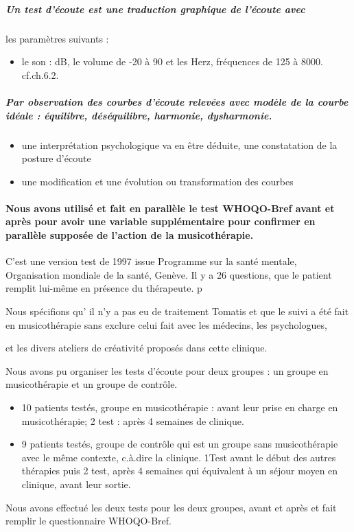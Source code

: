 \documentclass[12pt,french]{report}
\begin{document}
\subparagraph{Un test d'écoute est une traduction graphique de l'écoute avec }

les paramètres suivants : 
\begin{itemize}
\item le son : dB, le volume de -20 à 90 et les Herz, fréquences de 125
à 8000. cf.ch.6.2.
\end{itemize}

\subparagraph{Par observation des courbes d'écoute relevées avec modèle de la courbe
idéale : équilibre, déséquilibre, harmonie, dysharmonie.}
\begin{itemize}
\item une interprétation psychologique va en être déduite, une constatation
de la posture d'écoute
\item une modification et une évolution ou transformation des courbes
\end{itemize}

\paragraph{Nous avons utilisé et fait en parallèle le test WHOQO-Bref avant
et après pour avoir une variable supplémentaire pour confirmer en
parallèle supposée de l'action de la musicothérapie.}

C'est une version test de 1997 issue Programme sur la santé mentale,
Organisation mondiale de la santé, Genève. Il y a 26 questions, que
le patient remplit lui-même en présence du thérapeute. p

Nous spécifions qu' il n'y a pas eu de traitement Tomatis et que le
suivi a été fait en musicothérapie sans exclure celui fait avec les
médecins, les psychologues, 

et les divers ateliers de créativité proposés dans cette clinique.

Nous avons pu organiser les tests d'écoute pour deux groupes : un
groupe en musicothérapie et un groupe de contrôle.
\begin{itemize}
\item 10 patients testés, groupe en musicothérapie : avant leur prise en
charge en musicothérapie; 2\textdegree{} test : après 4 semaines de
clinique. 
\item 9 patients testés, groupe de contrôle qui est un groupe sans musicothérapie
avec le même contexte, c.à.dire la clinique. 1\textdegree Test avant
le début des autres thérapies puis 2\textdegree{} test, après 4 semaines
qui équivalent à un séjour moyen en clinique, avant leur sortie.
\end{itemize}
Nous avons effectué les deux tests pour les deux groupes, avant et
après et fait remplir le questionnaire WHOQO-Bref.
\end{document}
